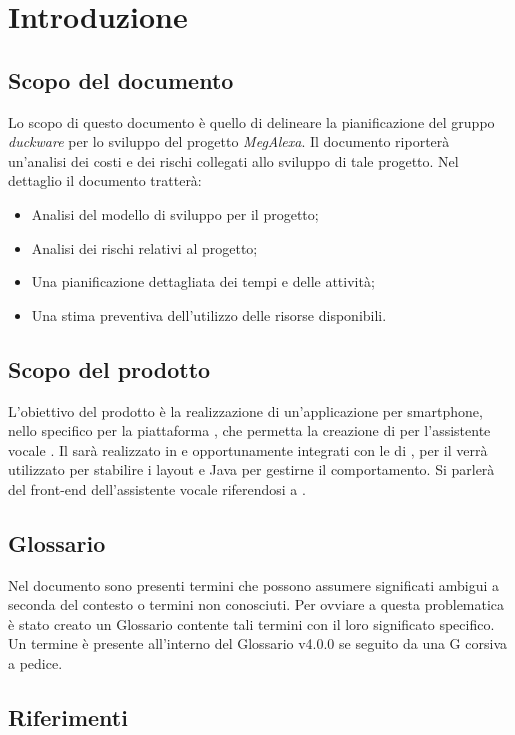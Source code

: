 \clearpage
\section{Introduzione}
\label{sec:intro}
\subsection{Scopo del documento}
Lo scopo di questo documento è quello di delineare la pianificazione del gruppo \emph{duckware} per lo sviluppo del progetto \emph{MegAlexa}. Il documento riporterà un'analisi dei costi e dei rischi collegati allo sviluppo di tale progetto. Nel dettaglio il documento tratterà:
\begin{itemize}
	\item Analisi del modello di sviluppo per il progetto;
	\item Analisi dei rischi relativi al progetto;
	\item Una pianificazione dettagliata dei tempi e delle attività;
	\item Una stima preventiva dell'utilizzo delle risorse disponibili.
\end{itemize}
\subsection{Scopo del prodotto}
L'obiettivo del prodotto è la realizzazione di un'applicazione per smartphone, nello specifico per la piattaforma , che permetta la creazione di  per l'assistente vocale  . Il  sarà realizzato in  e  opportunamente integrati con le  di , per il  verrà utilizzato  per stabilire i layout e Java per gestirne il comportamento. Si parlerà del front-end dell'assistente vocale riferendosi a .
\subsection{Glossario}
Nel documento sono presenti termini che possono assumere significati ambigui a seconda del contesto o termini non conosciuti. Per ovviare a questa problematica è stato creato un Glossario contente tali termini con il loro significato specifico. Un termine è presente all'interno del Glossario v4.0.0 se seguito da una G corsiva a pedice.
\subsection{Riferimenti}

